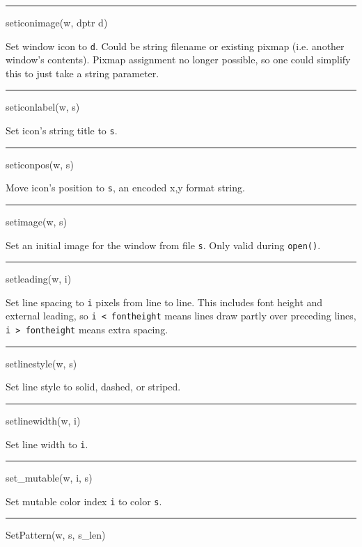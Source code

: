 {\sffamily\bfseries
\bigskip\hrule\vspace{0.1cm}
\noindent
seticonimage(w, dptr d)}


Set window icon to \texttt{d}. Could be string filename or existing
pixmap (i.e. another window's contents). Pixmap assignment no longer
possible, so one could simplify this to just take a string parameter.


{\sffamily\bfseries
\bigskip\hrule\vspace{0.1cm}
\noindent
seticonlabel(w, s)}


Set icon's string title to \texttt{s}.


{\sffamily\bfseries
\bigskip\hrule\vspace{0.1cm}
\noindent
seticonpos(w, s)}


Move icon's position to \texttt{s}, an encoded
{\textquotedbl}x,y{\textquotedbl} format string.


{\sffamily\bfseries
\bigskip\hrule\vspace{0.1cm}
\noindent
setimage(w, s)}


Set an initial image for the window from file \texttt{s}. Only valid
during \texttt{open()}.


{\sffamily\bfseries
\bigskip\hrule\vspace{0.1cm}
\noindent
setleading(w, i)}


Set line spacing to \texttt{i} pixels from line to line. This includes
font height and external leading, so \texttt{i~{\textless}~fontheight}
means lines draw partly over preceding lines,
\texttt{i~{\textgreater}~fontheight} means extra spacing.


{\sffamily\bfseries
\bigskip\hrule\vspace{0.1cm}
\noindent
setlinestyle(w, s)}


Set line style to solid, dashed, or striped.


{\sffamily\bfseries
\bigskip\hrule\vspace{0.1cm}
\noindent
setlinewidth(w, i)}


Set line width to \texttt{i}.


{\sffamily\bfseries
\bigskip\hrule\vspace{0.1cm}
\noindent
set\_mutable(w, i, s)}


Set mutable color index \texttt{i} to color \texttt{s}.


{\sffamily\bfseries
\bigskip\hrule\vspace{0.1cm}
\noindent
SetPattern(w, s, s\_len)}


